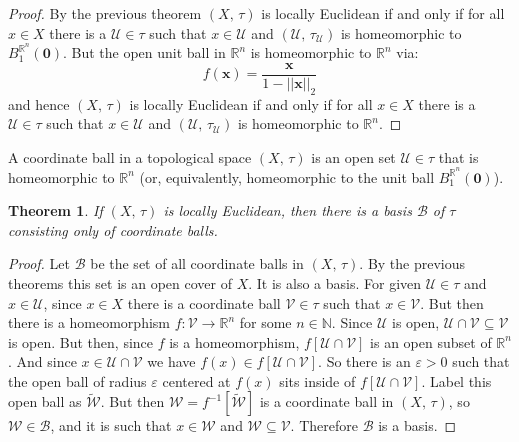 \documentclass{article}
\theoremstyle{plain}
\newtheorem{theorem}{Theorem}[section]
\theoremstyle{normal}
\newenvironment{definition}{%
    \pushQED{\qed}\renewcommand{\qedsymbol}{$\blacksquare$}\definitionx%
}{%
    \popQED\enddefinitionx%
}
\begin{document}
        \begin{proof}
            By the previous theorem $(X,\,\tau)$ is locally Euclidean if and
            only if for all $x\in{X}$ there is a $\mathcal{U}\in\tau$ such that
            $x\in\mathcal{U}$ and $(\mathcal{U},\,\tau_{\mathcal{U}})$ is
            homeomorphic to $B_{1}^{\mathbb{R}^{n}}(\mathbf{0})$. But
            the open unit ball in $\mathbb{R}^{n}$ is homeomorphic to
            $\mathbb{R}^{n}$ via:
            \begin{equation}
                f(\mathbf{x})=
                \frac{\mathbf{x}}{1-||\mathbf{x}||_{2}}
            \end{equation}
            and hence $(X,\,\tau)$ is locally Euclidean if and only if for all
            $x\in{X}$ there is a $\mathcal{U}\in\tau$ such that
            $x\in\mathcal{U}$ and $(\mathcal{U},\,\tau_{\mathcal{U}})$ is
            homeomorphic to $\mathbb{R}^{n}$.
        \end{proof}
        \begin{definition}[\textbf{Coordinate Ball}]
            A coordinate ball in a topological space $(X,\,\tau)$ is an open
            set $\mathcal{U}\in\tau$ that is homeomorphic to $\mathbb{R}^{n}$
            (or, equivalently, homeomorphic to the unit ball
            $B_{1}^{\mathbb{R}^{n}}(\mathbf{0})$).
        \end{definition}
        \begin{theorem}
            If $(X,\,\tau)$ is locally Euclidean, then there is a basis
            $\mathcal{B}$ of $\tau$ consisting only of coordinate balls.
        \end{theorem}
        \begin{proof}
            Let $\mathcal{B}$ be the set of all coordinate balls in
            $(X,\,\tau)$. By the previous theorems this set is an open cover of
            $X$. It is also a basis. For given $\mathcal{U}\in\tau$ and
            $x\in\mathcal{U}$, since $x\in{X}$ there is a coordinate ball
            $\mathcal{V}\in\tau$ such that $x\in\mathcal{V}$. But then there
            is a homeomorphism $f:\mathcal{V}\rightarrow\mathbb{R}^{n}$ for some
            $n\in\mathbb{N}$. Since $\mathcal{U}$ is open,
            $\mathcal{U}\cap\mathcal{V}\subseteq\mathcal{V}$ is open. But then,
            since $f$ is a homeomorphism, $f[\mathcal{U}\cap\mathcal{V}]$ is
            an open subset of $\mathbb{R}^{n}$. And since
            $x\in\mathcal{U}\cap\mathcal{V}$ we have
            $f(x)\in{f}[\mathcal{U}\cap\mathcal{V}]$. So there is an
            $\varepsilon>0$ such that the open ball of radius $\varepsilon$
            centered at $f(x)$ sits inside of $f[\mathcal{U}\cap\mathcal{V}]$.
            Label this open ball as $\tilde{\mathcal{W}}$. But then
            $\mathcal{W}=f^{-1}[\tilde{\mathcal{W}}]$ is a coordinate ball in
            $(X,\,\tau)$, so $\mathcal{W}\in\mathcal{B}$, and it is such that
            $x\in\mathcal{W}$ and $\mathcal{W}\subseteq\mathcal{V}$. Therefore
            $\mathcal{B}$ is a basis.
        \end{proof}
\end{document}
